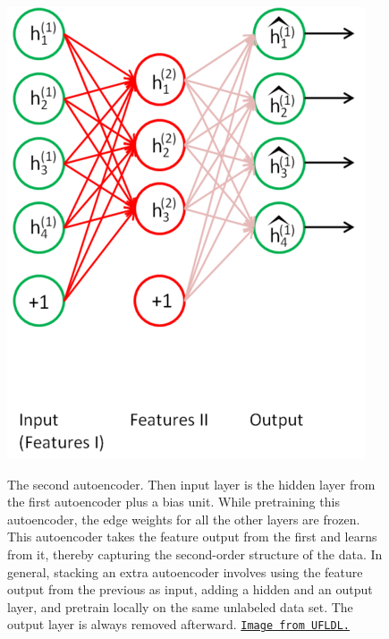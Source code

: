 \documentclass[12pt]{article}  %
\begin{document}
\begin{figure}[H]
\begin{minipage}{.45\linewidth}
\includegraphics[scale=1]{images/deep_2.png}\\
\caption{The second autoencoder. Then input layer is the hidden layer from the first autoencoder plus a bias unit. While pretraining this autoencoder, the edge weights for all the other layers are frozen. This autoencoder takes the feature output from the first and learns from it, thereby capturing the second-order structure of the data. In general, stacking an extra autoencoder involves using the feature output from the previous as input, adding a hidden and an output layer, and pretrain locally on the same unlabeled data set. The output layer is always removed afterward. \href{http://deeplearning.stanford.edu/wiki/index.php/Stacked_Autoencoders}{\tt Image from UFLDL.}}\label{deep2}
\end{minipage}
\end{figure}
\end{document}

